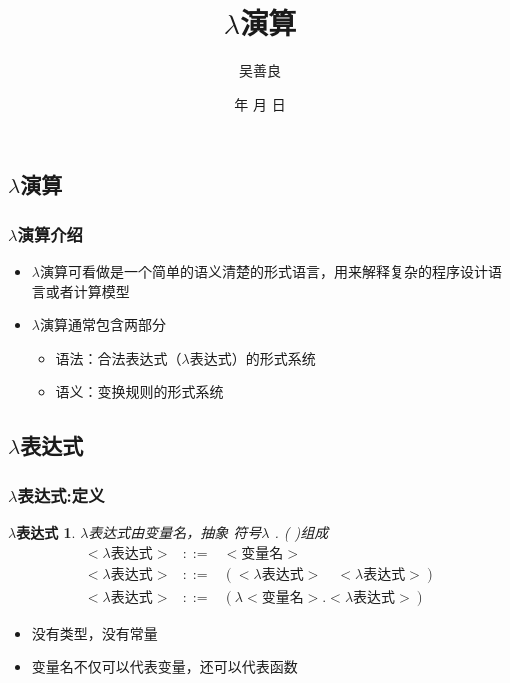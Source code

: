 \documentclass[CJKutf8,compress,hyperref]{beamer}
\renewcommand{\today}{\number\year 年 \number\month 月 \number\day 日}
\begin{document}
\begin{CJK}{UTF8}{song}
 
\title{$\lambda$演算}
\author{吴善良}
\date{ \today}

\frame{\titlepage}
\tableofcontents
\section{$\lambda$演算}

\begin{frame}
  \frametitle{$\lambda$演算介绍}
  \begin{itemize}
  \item $\lambda$演算可看做是一个简单的语义清楚的形式语言，用来解释复杂的程序设计语言或者计算模型
  \item $\lambda$演算通常包含两部分
    \begin{itemize} 
    \item{语法}：合法表达式（{\color{red}$\lambda$}表达式）的形式系统
    \item{语义}：变换规则的形式系统
    \end{itemize}
  \end{itemize}
\end{frame}

\subsection{ $\lambda$表达式}

\begin{frame}
  \frametitle{$\lambda$表达式:定义}
  \newtheorem{LE}{$\lambda$表达式} 
  \begin{LE}
    $\lambda$表达式由变量名，抽象
    符号$\lambda$ . ( )组成 
    \begin{eqnarray*}
      <\textrm{$\lambda$表达式}> & ::= & <\textrm{变量名}> \\
      <\textrm{$\lambda$表达式}> & ::= & (<\textrm{$\lambda$表达式}>\quad<\textrm{$\lambda$表达式}>) \\ 
      <\textrm{$\lambda$表达式}> & ::= & (\lambda<\textrm{变量名}>.<\textrm{$\lambda$表达式}>)  
    \end{eqnarray*} 
  \end{LE}      
  \begin{itemize}
  \item 没有类型，没有常量 
  \item 变量名不仅可以代表变量，还可以代表{\color{red}函数}
  \end{itemize}
\end{frame}


\end{CJK}
\end{document}
